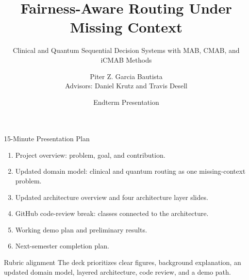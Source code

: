 \documentclass[aspectratio=169,10pt]{beamer}
\title[Fairness-Aware Routing]{Fairness-Aware Routing Under Missing Context}
\subtitle{Clinical and Quantum Sequential Decision Systems with MAB, CMAB, and iCMAB Methods}
\author[P. Z. Garcia Bautista]{Piter Z. Garcia Bautista\\Advisors: Daniel Krutz and Travis Desell}
\institute[RIT]{Rochester Institute of Technology\\DSCI 601 -- Applied Data Science I}
\date{Endterm Presentation}
\begin{document}
\begin{frame}
  \titlepage
\end{frame}

\begin{frame}{15-Minute Presentation Plan}
\begin{enumerate}
    \item Project overview: problem, goal, and contribution.
    \item Updated domain model: clinical and quantum routing as one missing-context problem.
    \item Updated architecture overview and four architecture layer slides.
    \item GitHub code-review break: classes connected to the architecture.
    \item Working demo plan and preliminary results.
    \item Next-semester completion plan.
\end{enumerate}
\vspace{0.5em}
\begin{block}{Rubric alignment}
The deck prioritizes clear figures, background explanation, an updated domain model, layered architecture, code review, and a demo path.
\end{block}
\end{frame}
\end{document}
